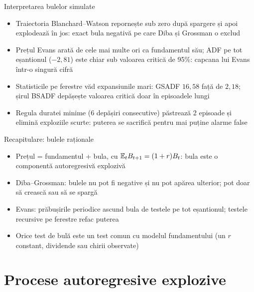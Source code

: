 \begin{frame}{Interpretarea bulelor simulate}
\itemsize{\small}
\begin{itemize}
    \item Traiectoria Blanchard--Watson repornește sub zero după spargere și apoi explodează în jos: exact bula negativă pe care Diba și Grossman o exclud
    \item Prețul Evans arată de cele mai multe ori ca fundamentul său; ADF pe tot eșantionul ($\ensuremath{-}2{,}81$) este chiar sub valoarea critică de 95\%: capcana lui Evans într-o singură cifră
    \item Statisticile pe ferestre văd expansiunile mari: GSADF $16{,}58$ față de $2{,}18$; șirul BSADF depășește valoarea critică doar în episoadele lungi
    \item Regula duratei minime ($6$ depășiri consecutive) păstrează 2 episoade și elimină exploziile scurte: puterea se sacrifică pentru mai puține alarme false
\end{itemize}
\end{frame}

\begin{frame}{Recapitulare: bulele raționale}
\itemsize{\small}
\begin{itemize}
    \item Prețul = fundamentul + bula, cu $\mathbb{E}_t B_{t+1} = (1 + r)B_t$: bula este o componentă autoregresivă explozivă
    \item Diba--Grossman: bulele nu pot fi negative și nu pot apărea ulterior; pot doar să crească sau să se spargă
    \item Evans: prăbușirile periodice ascund bula de testele pe tot eșantionul; testele recursive pe ferestre refac puterea
    \item Orice test de bulă este un test comun cu modelul fundamentului (un $r$ constant, dividende sau chirii observate)
\end{itemize}
\end{frame}


\section{Procese autoregresive explozive}

